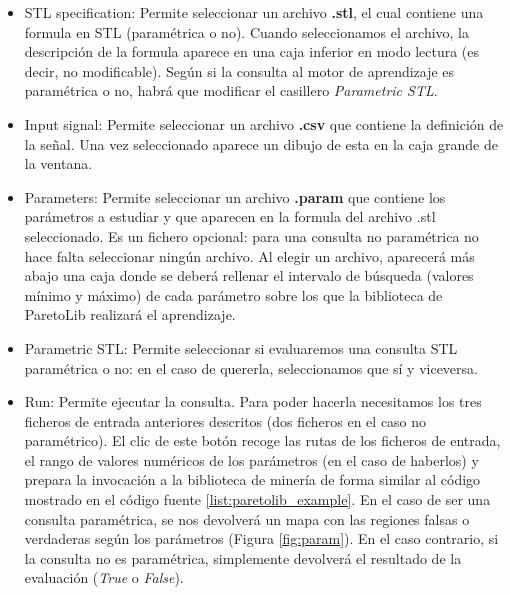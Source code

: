 \begin{itemize}
\item STL specification: Permite seleccionar un archivo \textbf{.stl}, el cual contiene una formula en STL (paramétrica o no). Cuando seleccionamos el archivo, la descripción de la formula aparece en una caja inferior en modo lectura (es decir, no modificable). Según si la consulta al motor de aprendizaje es paramétrica o no, habrá que modificar el casillero \textit{Parametric STL}.

\item Input signal: Permite seleccionar un archivo \textbf{.csv} que contiene la definición de la señal. Una vez seleccionado aparece un dibujo de esta en la caja grande de la ventana.

\item Parameters: Permite seleccionar un archivo \textbf{.param} que contiene los parámetros a estudiar y que aparecen en la formula del archivo .stl seleccionado. Es un fichero opcional: para una consulta no paramétrica no hace falta seleccionar ningún archivo. Al elegir un archivo, aparecerá más abajo una caja donde se deberá rellenar el intervalo de búsqueda (valores mínimo y máximo) de cada parámetro sobre los que la biblioteca de ParetoLib realizará el aprendizaje.

\item Parametric STL: Permite seleccionar si evaluaremos una consulta STL paramétrica o no: en el caso de quererla, seleccionamos que sí y viceversa.

\item Run: Permite ejecutar la consulta. Para poder hacerla necesitamos los tres ficheros de entrada anteriores descritos (dos ficheros en el caso no paramétrico). El clic de este botón recoge las rutas de los ficheros de entrada, el rango de valores numéricos de los parámetros (en el caso de haberlos) y prepara la invocación a la biblioteca de minería de forma similar al código mostrado en el código fuente \ref{list:paretolib_example}. En el caso de ser una consulta paramétrica, se nos devolverá un mapa con las regiones falsas o verdaderas según los parámetros (Figura \ref{fig:param}). En el caso contrario, si la consulta no es paramétrica, simplemente devolverá el resultado de la evaluación (\textit{True} o \textit{False}).
\end{itemize}
